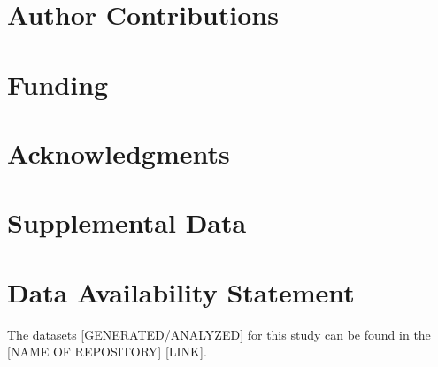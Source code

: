 \documentclass[utf8]{frontiersSCNS} %
\begin{document}
\section*{Author Contributions}

\section*{Funding}

\section*{Acknowledgments}

\section*{Supplemental Data}

\section*{Data Availability Statement}
The datasets [GENERATED/ANALYZED] for this study can be found in the [NAME OF REPOSITORY] [LINK].
\end{document}

